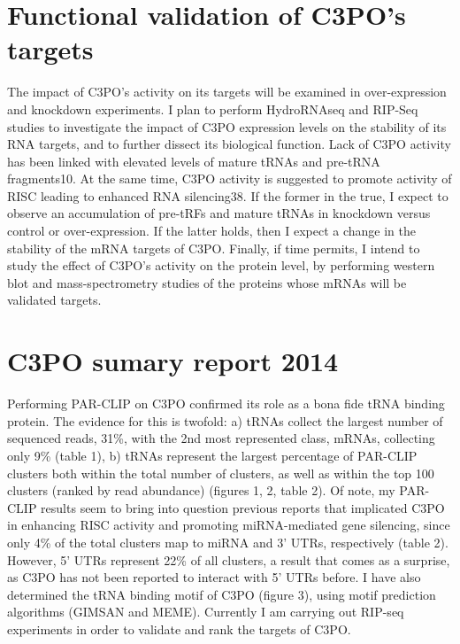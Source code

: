 \documentclass[12pt]{rockefeller}
\begin{document}
\section{Functional validation of C3PO’s targets}
The impact of C3PO’s activity on its targets will be examined in over-expression and knockdown experiments. I plan to perform HydroRNAseq and RIP-Seq studies to investigate the impact of C3PO expression levels on the stability of its RNA targets, and to further dissect its biological function. Lack of C3PO activity has been linked with elevated levels of mature tRNAs and pre-tRNA fragments10. At the same time, C3PO activity is suggested to promote activity of RISC leading to enhanced RNA silencing38. If the former in the true, I expect to observe an accumulation of pre-tRFs and mature tRNAs in knockdown versus control or over-expression. If the latter holds, then I expect a change in the stability of the mRNA targets of C3PO. Finally, if time permits, I intend to study the effect of C3PO’s activity on the protein level, by performing western blot and mass-spectrometry studies of the proteins whose mRNAs will be validated targets. 

\section{C3PO sumary report 2014}
Performing PAR-CLIP on C3PO confirmed its role as a bona fide tRNA binding protein. The evidence for this is twofold: a) tRNAs collect the largest number of sequenced reads, 31\%, with the 2nd most represented class, mRNAs, collecting only 9\% (table 1), b) tRNAs represent the largest percentage of PAR-CLIP clusters both within the total number of clusters, as well as within the top 100 clusters (ranked by read abundance) (figures 1, 2, table 2). Of note, my PAR-CLIP results seem to bring into question previous reports that implicated C3PO in enhancing RISC activity and promoting miRNA-mediated gene silencing, since only 4\% of the total clusters map to miRNA and 3’ UTRs, respectively (table 2). However, 5’ UTRs represent 22\% of all clusters, a result that comes as a surprise, as C3PO has not been reported to interact with 5’ UTRs before. I have also determined the tRNA binding motif of C3PO (figure 3), using motif prediction algorithms (GIMSAN and MEME). Currently I am carrying out RIP-seq experiments in order to validate and rank the targets of C3PO.
\end{document}
